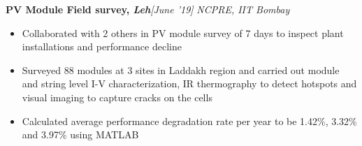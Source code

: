 \documentclass[10 pt]{article}%
\begin{document}
{{\flushleft \bf {\large{PV Module Field survey}}, \em{Leh}}\hfill {{{\em{[June '19]}}}}
\vspace{-0.8em}
{\flushleft \em{NCPRE, IIT Bombay}}
\vspace{-5pt}
\begin{itemize}[leftmargin=*]
\setlength\itemsep{1.5pt}
\setlength\parskip{1.5pt}
\item Collaborated with 2 others in PV module survey of 7 days to inspect plant installations and performance decline
\item Surveyed 88 modules at 3 sites in Laddakh region and carried out module and string level I-V characterization, IR thermography to detect hotspots and visual imaging to capture cracks on the cells
\item Calculated average performance degradation rate per year to be  1.42\%, 3.32\% and 3.97\% using MATLAB
\end{itemize}

}
\end{document}
